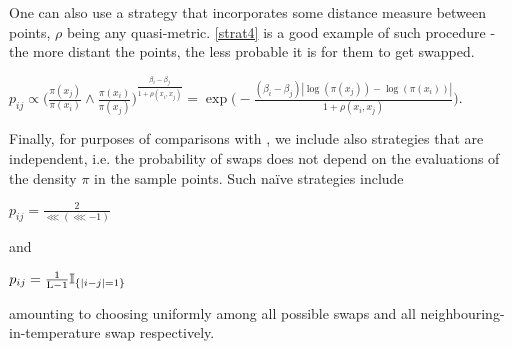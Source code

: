 One can also use a strategy that incorporates some distance measure between points, $\rho$ being any quasi-metric. \ref{strat4} is a good example of such procedure - the more distant the points, the less probable it is for them to get swapped.  

\begin{strategy}[resume]
	\item 
		$p_{ij} \propto \Big( \frac{\pi (x_j)}{\pi( x_i )} \wedge \frac{\pi (x_i)}{\pi( x_j )} \Big)^\frac{\beta_i - \beta_j}{1 + \rho(x_i, x_j)} = \exp \Big( - \frac{(\beta_i - \beta_j)| \log ( \pi(x_j) ) - \log ( \pi(x_i) ) |}{{1 + \rho(x_i, x_j)}} \Big).$\label{strat4}
\end{strategy} 

Finally, for purposes of comparisons with \citet{BaragattiParallelTemperingWithEquiEnergyMoves}, we include also strategies that are \sspace\, independent, i.e. the probability of swaps does not depend on the evaluations of the density $\pi$ in the sample points. Such na\"ive strategies include 

\begin{strategy}[resume]
	\item $p_{ij} = \frac{2}{\lll (\lll - 1)}$\label{strat5}
\end{strategy}

and 

\begin{strategy}[resume]
	\item $p_{ij} = \frac{1}{\mathrm{L} - 1} \mathbb{I}_{ \{|i-j|=1\} }$\label{strat6}
\end{strategy}

amounting to choosing uniformly among all possible swaps and all neighbouring-in-temperature swap respectively. 